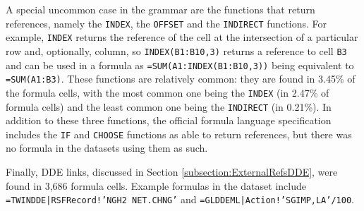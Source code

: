 \documentclass[conference]{IEEEtran}
\begin{document}
A special uncommon case in the grammar are the functions that return references, namely the \texttt{INDEX}, the \texttt{OFFSET} and the \texttt{INDIRECT} functions. For example, \texttt{INDEX} returns the reference of the cell at the intersection of a particular row and, optionally, column, so \texttt{INDEX(B1:B10,3)} returns a reference to cell \texttt{B3} and can be used in a formula as \texttt{=SUM(A1:INDEX(B1:B10,3))} being equivalent to \texttt{=SUM(A1:B3)}. These functions are relatively common: they are found in 3.45\% of the formula cells, with the most common one being the \texttt{INDEX} (in 2.47\% of formula cells) and the least common one being the \texttt{INDIRECT} (in 0.21\%). In addition to these three functions, the official formula language specification includes the \texttt{IF} and \texttt{CHOOSE} functions as able to return references, but there was no formula in the datasets using them as such.

Finally, DDE links, discussed in Section \ref{subsection:ExternalRefsDDE}, were found in 3,686 formula cells. Example formulas in the dataset include \texttt{=TWINDDE|RSFRecord!'NGH2 NET.CHNG'} and \texttt{=GLDDEML|Action!'SGIMP,LA'/100}.
\end{document}
